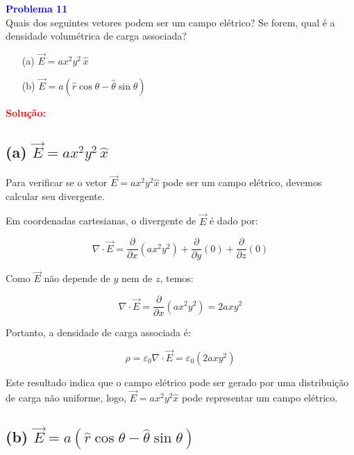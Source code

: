 \documentclass[a4paper,12pt]{article}
\begin{document}
\begin{flushleft}
\textbf{\textcolor{blue}{\Large Problema 11}}\\

Quais dos seguintes vetores podem ser um campo elétrico? Se forem, qual é a densidade 
volumétrica de carga associada?

\begin{itemize}
    \item[(a)] \( \vec{E} = a x^2 y^2 \, \hat{x} \)
    \item[(b)] \( \vec{E} = a ( \hat{r} \cos \theta - \hat{\theta} \sin \theta ) \)
\end{itemize}

\textcolor{red}{\textbf{Solução:}}\\

\subsection*{(a) \( \vec{E} = a x^2 y^2 \, \hat{x} \)}

Para verificar se o vetor \( \vec{E} = a x^2 y^2 \hat{x} \) pode ser um campo elétrico, devemos calcular seu divergente.

Em coordenadas cartesianas, o divergente de \( \vec{E} \) é dado por:

\begin{equation}
\nabla \cdot \vec{E} = \frac{\partial}{\partial x}(a x^2 y^2) + \frac{\partial}{\partial y}(0) + \frac{\partial}{\partial z}(0)
\end{equation}

Como \( \vec{E} \) não depende de \( y \) nem de \( z \), temos:

\begin{equation}
\nabla \cdot \vec{E} = \frac{\partial}{\partial x}(a x^2 y^2) = 2a x y^2
\end{equation}

Portanto, a densidade de carga associada é:

\begin{equation}
\rho = \varepsilon_0 \nabla \cdot \vec{E} = \varepsilon_0 (2a x y^2)
\end{equation}

Este resultado indica que o campo elétrico pode ser gerado por uma distribuição de carga 
não uniforme, logo, \( \vec{E} = a x^2 y^2 \hat{x} \) pode representar um campo elétrico.

\subsection*{(b) \( \vec{E} = a ( \hat{r} \cos \theta - \hat{\theta} \sin \theta ) \)}


\end{flushleft}
\end{document}

